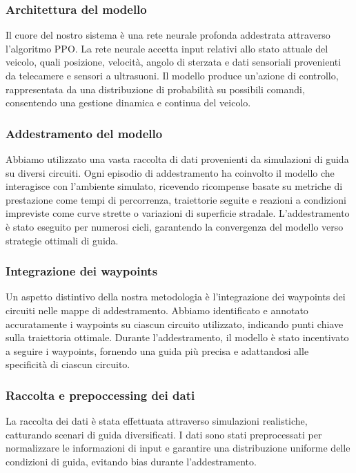 \documentclass[conference]{IEEEtran}
\begin{document}
\subsubsection{Architettura del modello}
Il cuore del nostro sistema è una rete neurale profonda addestrata attraverso l'algoritmo PPO. La rete neurale accetta input relativi allo stato attuale del veicolo, quali posizione, velocità, angolo di sterzata e dati sensoriali provenienti da telecamere e sensori a ultrasuoni. Il modello produce un'azione di controllo, rappresentata da una distribuzione di probabilità su possibili comandi, consentendo una gestione dinamica e continua del veicolo.

\subsubsection{Addestramento del modello}
Abbiamo utilizzato una vasta raccolta di dati provenienti da simulazioni di guida su diversi circuiti. Ogni episodio di addestramento ha coinvolto il modello che interagisce con l'ambiente simulato, ricevendo ricompense basate su metriche di prestazione come tempi di percorrenza, traiettorie seguite e reazioni a condizioni impreviste come curve strette o variazioni di superficie stradale. L'addestramento è stato eseguito per numerosi cicli, garantendo la convergenza del modello verso strategie ottimali di guida.

\subsubsection{Integrazione dei waypoints}

Un aspetto distintivo della nostra metodologia è l'integrazione dei waypoints dei circuiti nelle mappe di addestramento.
%
Abbiamo identificato e annotato accuratamente i waypoints su ciascun circuito utilizzato, indicando punti chiave sulla traiettoria ottimale.
%
Durante l'addestramento, il modello è stato incentivato a seguire i waypoints, fornendo una guida più precisa e adattandosi alle specificità di ciascun circuito.

\subsubsection{Raccolta e prepoccessing dei dati}
La raccolta dei dati è stata effettuata attraverso simulazioni realistiche, catturando scenari di guida diversificati. I dati sono stati preprocessati per normalizzare le informazioni di input e garantire una distribuzione uniforme delle condizioni di guida, evitando bias durante l'addestramento.
\end{document}
